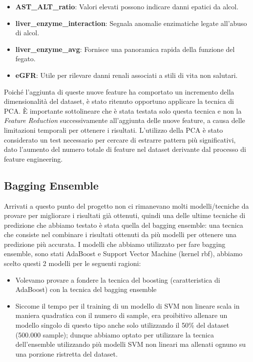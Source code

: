 \documentclass{article}
\begin{document}
\begin{multicols}{2}
\begin{itemize}[leftmargin=*]
    \item \textbf{AST\_ALT\_ratio}: Valori elevati possono indicare danni epatici da alcol.
    \item \textbf{liver\_enzyme\_interaction}: Segnala anomalie enzimatiche legate all'abuso di alcol.
    \item \textbf{liver\_enzyme\_avg}: Fornisce una panoramica rapida della funzione del fegato.
    \item \textbf{eGFR}: Utile per rilevare danni renali associati a stili di vita non salutari.~\cite{levey2009new}
\end{itemize}

Poiché l'aggiunta di queste nuove feature ha comportato un incremento della dimensionalità del dataset, è stato ritenuto opportuno applicare la tecnica di PCA. È importante sottolineare che è stata testata solo questa tecnica e non la \textit{Feature Reduction} successivamente all'aggiunta delle nuove feature, a causa delle limitazioni temporali per ottenere i risultati. L'utilizzo della PCA è stato considerato un test necessario per cercare di estrarre pattern più significativi, dato l'aumento del numero totale di feature nel dataset derivante dal processo di feature engineering.



\subsection{Bagging Ensemble}

Arrivati a questo punto del progetto non ci rimanevano molti modelli/tecniche da provare per migliorare i risultati già ottenuti, quindi una delle ultime tecniche di predizione che abbiamo testato è stata quella del bagging ensemble: una tecnica che consiste nel combinare i risultati ottenuti da più modelli per ottenere una predizione più accurata. I modelli che abbiamo utilizzato per fare bagging ensemble, sono stati AdaBoost e Support Vector Machine (kernel rbf), abbiamo scelto questi 2 modelli per le seguenti ragioni:

\begin{itemize}[leftmargin=*]
    \item Volevamo provare a fondere la tecnica del boosting (caratteristica di AdaBoost) con la tecnica del bagging ensemble
    \item Siccome il tempo per il training di un modello di SVM non lineare scala in maniera quadratica con il numero di sample, era proibitivo allenare un modello singolo di questo tipo anche solo utilizzando il 50\% del dataset (500.000 sample); dunque abbiamo optato per utilizzare la tecnica dell'ensemble utilizzando più modelli SVM non lineari ma allenati ognuno su una porzione ristretta del dataset.
\end{itemize}


\end{multicols}
\end{document}
